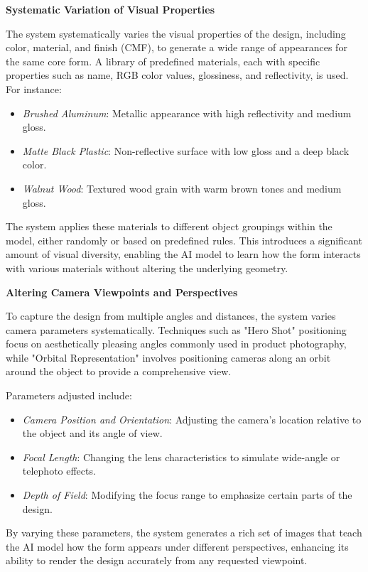 \documentclass{article}
\begin{document}
\textbf{Systematic Variation of Visual Properties}

The system systematically varies the visual properties of the design, including color, material, and finish (CMF), to generate a wide range of appearances for the same core form. A library of predefined materials, each with specific properties such as name, RGB color values, glossiness, and reflectivity, is used. For instance:

\begin{itemize}
    \item \textit{Brushed Aluminum}: Metallic appearance with high reflectivity and medium gloss.
    \item \textit{Matte Black Plastic}: Non-reflective surface with low gloss and a deep black color.
    \item \textit{Walnut Wood}: Textured wood grain with warm brown tones and medium gloss.
\end{itemize}

The system applies these materials to different object groupings within the model, either randomly or based on predefined rules. This introduces a significant amount of visual diversity, enabling the AI model to learn how the form interacts with various materials without altering the underlying geometry.

\textbf{Altering Camera Viewpoints and Perspectives}

To capture the design from multiple angles and distances, the system varies camera parameters systematically. Techniques such as "Hero Shot" positioning focus on aesthetically pleasing angles commonly used in product photography, while "Orbital Representation" involves positioning cameras along an orbit around the object to provide a comprehensive view.

Parameters adjusted include:

\begin{itemize}
    \item \textit{Camera Position and Orientation}: Adjusting the camera's location relative to the object and its angle of view.
    \item \textit{Focal Length}: Changing the lens characteristics to simulate wide-angle or telephoto effects.
    \item \textit{Depth of Field}: Modifying the focus range to emphasize certain parts of the design.
\end{itemize}

By varying these parameters, the system generates a rich set of images that teach the AI model how the form appears under different perspectives, enhancing its ability to render the design accurately from any requested viewpoint.
\end{document}
